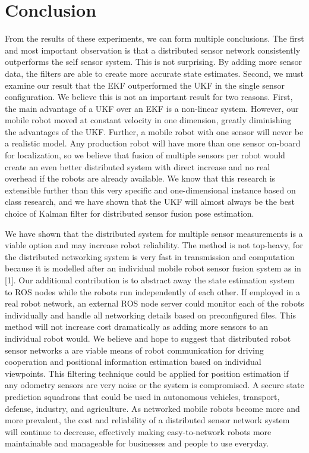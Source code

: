 \documentclass[conference]{IEEEtran} \usepackage[T1]{fontenc} \usepackage[backend=biber, style=ieee]{biblatex}
\begin{document}
\section{Conclusion} \label{Conclusion} 
From the results of these experiments, we can form multiple conclusions. The first and most important observation is that a distributed sensor network consistently 
outperforms the self sensor system. This is not surprising. By adding more sensor data, the filters are able to create more accurate state estimates. Second, we 
must examine our result that the EKF outperformed the UKF in the single sensor configuration. We believe this is not an important result for two reasons. First, the 
main advantage of a UKF over an EKF is a non-linear system. However, our mobile robot moved at constant velocity in one dimension, greatly diminishing the 
advantages of the UKF. Further, a mobile robot with one sensor will never be a realistic model. Any production robot will have more than one sensor on-board for 
localization, so we believe that fusion of multiple sensors per robot would create an even better distributed system with direct increase and no real overhead if 
the robots are already available. We know that this research is extensible further than this very specific and one-dimensional instance based on class research, and 
we have shown that the UKF will almost always be the best choice of Kalman filter for distributed sensor fusion pose estimation.

We have shown that the distributed system for multiple sensor measurements is a viable option and may increase robot reliability. The method is not top-heavy, 
for the distributed networking system is very fast in transmission and computation because it is modelled after an individual mobile robot sensor fusion system as 
in [1]. Our additional contribution is to abstract away the state estimation system to ROS nodes while the robots run independently of each other. If employed in 
a real robot network, an external ROS node server could monitor each of the robots individually and handle all networking details based on preconfigured files. 
This method will not increase cost dramatically as adding more sensors to an individual robot would. We believe and hope to suggest that distributed robot sensor 
networks a are viable means of robot communication for driving cooperation and positional information estimation based on individual viewpoints. This filtering 
technique could be applied for position estimation if any odometry sensors are very noise or the system is compromised. A  secure state prediction squadrons that 
could be used in autonomous vehicles, transport, defense, industry, and agriculture. As networked mobile robots become more and more prevalent, the cost and 
reliability of a distributed sensor network system will continue to decrease, effectively making easy-to-network robots more maintainable and manageable for 
businesses and people to use everyday.
\end{document}
